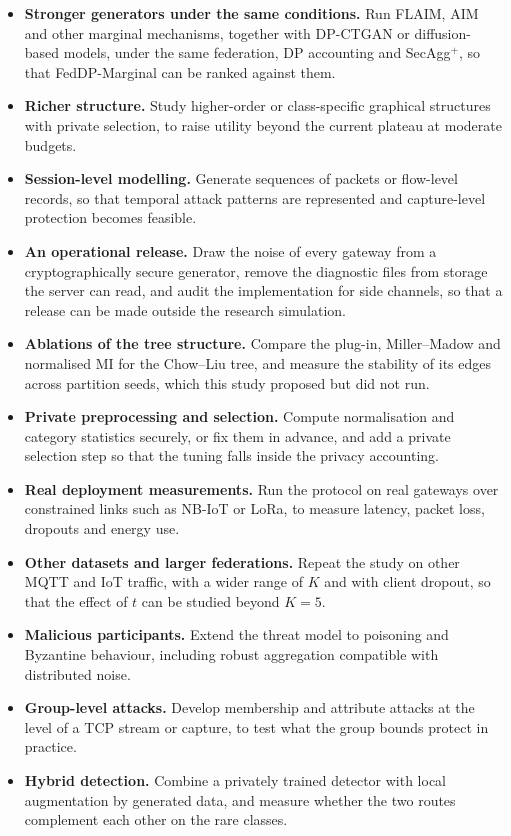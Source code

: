 \begin{itemize}
    \item \textbf{Stronger generators under the same conditions.} Run FLAIM, AIM and other marginal mechanisms, together with DP-CTGAN or diffusion-based models, under the same federation, DP accounting and SecAgg$^+$, so that FedDP-Marginal can be ranked against them.
    \item \textbf{Richer structure.} Study higher-order or class-specific graphical structures with private selection, to raise utility beyond the current plateau at moderate budgets.
    \item \textbf{Session-level modelling.} Generate sequences of packets or flow-level records, so that temporal attack patterns are represented and capture-level protection becomes feasible.
    \item \textbf{An operational release.} Draw the noise of every gateway from a cryptographically secure generator, remove the diagnostic files from storage the server can read, and audit the implementation for side channels, so that a release can be made outside the research simulation.
    \item \textbf{Ablations of the tree structure.} Compare the plug-in, Miller--Madow and normalised MI for the Chow--Liu tree, and measure the stability of its edges across partition seeds, which this study proposed but did not run.
    \item \textbf{Private preprocessing and selection.} Compute normalisation and category statistics securely, or fix them in advance, and add a private selection step so that the tuning falls inside the privacy accounting.
    \item \textbf{Real deployment measurements.} Run the protocol on real gateways over constrained links such as NB-IoT or LoRa, to measure latency, packet loss, dropouts and energy use.
    \item \textbf{Other datasets and larger federations.} Repeat the study on other MQTT and IoT traffic, with a wider range of $K$ and with client dropout, so that the effect of $t$ can be studied beyond $K = 5$.
    \item \textbf{Malicious participants.} Extend the threat model to poisoning and Byzantine behaviour, including robust aggregation compatible with distributed noise.
    \item \textbf{Group-level attacks.} Develop membership and attribute attacks at the level of a TCP stream or capture, to test what the group bounds protect in practice.
    \item \textbf{Hybrid detection.} Combine a privately trained detector with local augmentation by generated data, and measure whether the two routes complement each other on the rare classes.
\end{itemize}
